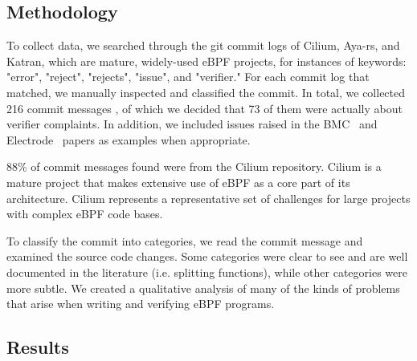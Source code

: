 
\subsection{Methodology}
To collect data, we searched through the git commit logs of Cilium, Aya-rs, and
    Katran, which are mature, widely-used eBPF projects, for instances of
    keywords: "error", "reject", "rejects", "issue", and "verifier."
For each commit log that matched, we manually inspected and classified the commit.%
In total, we collected 216 commit messages , of which we decided that 73 of them were actually about verifier complaints.
In addition, we included  issues raised in the BMC~\cite{BMC} and Electrode~\cite{Electrode} papers as examples when appropriate.

88\% of commit messages found were from the Cilium repository.
Cilium is a mature project that makes extensive use of eBPF as a core part of its architecture.
Cilium represents a representative set of challenges for large projects with complex eBPF code bases.

To classify the commit into categories, we read the commit message and examined
    the source code changes.
Some categories were clear to see and are well documented in the literature (i.e. splitting functions), while other categories were more subtle.
We created a qualitative analysis of many of the kinds of problems that arise when writing and verifying eBPF programs.

\subsection{Results}

